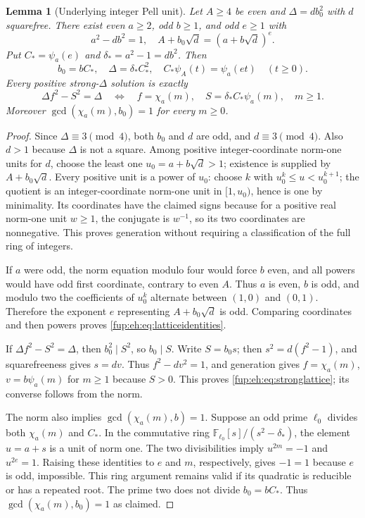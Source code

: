 \documentclass[11pt,letterpaper]{article}
\newtheorem{lemma}[theorem]{Lemma}
\theoremstyle{definition}\newtheorem{definition}[theorem]{Definition}
\theoremstyle{remark}\newtheorem{remark}[theorem]{Remark}
\newcommand{\D}{\Delta}
\begin{document}
\begin{lemma}[Underlying integer Pell unit]\label{fup:eh:lem:lattice}
Let $A\ge4$ be even and $\D=d b_0^2$ with $d$ squarefree.
There exist even $a\ge2$, odd $b\ge1$, and odd $e\ge1$ with
\[
 a^2-db^2=1,\quad
 A+b_0\sqrt d=(a+b\sqrt d)^e.
\]
Put $C_*=\psi_a(e)$ and $\delta_*=a^2-1=db^2$. Then
\begin{equation}\label{fup:eh:eq:latticeidentities}
 b_0=bC_*,\quad \D=\delta_*C_*^2,\quad
 C_*\psi_A(t)=\psi_a(et)\quad(t\ge0).
\end{equation}
Every positive strong-$\D$ solution is exactly
\begin{equation}\label{fup:eh:eq:stronglattice}
 \D f^2-S^2=\D
 \quad\Longleftrightarrow\quad
 f=\chi_a(m),\quad S=\delta_*C_*\psi_a(m),\quad m\ge1.
\end{equation}
Moreover $\gcd(\chi_a(m),b_0)=1$ for every $m\ge0$.
\end{lemma}
\begin{proof}
Since $\D\equiv3\pmod4$, both $b_0$ and $d$ are odd, and
$d\equiv3\pmod4$. Also $d>1$ because $\D$ is not a square.
Among positive integer-coordinate norm-one units for $d$, choose
the least one $u_0=a+b\sqrt d>1$; existence is supplied by
$A+b_0\sqrt d$. Every positive unit is a power of $u_0$:
choose $k$ with $u_0^k\le u<u_0^{k+1}$; the quotient is an
integer-coordinate norm-one unit in $[1,u_0)$, hence is one by
minimality. Its coordinates have the claimed signs because for a
positive real norm-one unit $w\ge1$, the conjugate is $w^{-1}$,
so its two coordinates are nonnegative. This proves generation
without requiring a classification of the full ring of integers.

If $a$ were odd, the norm equation modulo four would force $b$ even,
and all powers would have odd first coordinate, contrary to even $A$.
Thus $a$ is even, $b$ is odd, and modulo two the coefficients of
$u_0^k$ alternate between $(1,0)$ and $(0,1)$. Therefore the exponent
$e$ representing $A+b_0\sqrt d$ is odd. Comparing coordinates and
then powers proves \eqref{fup:eh:eq:latticeidentities}.

If $\D f^2-S^2=\D$, then $b_0^2\mid S^2$, so $b_0\mid S$.
Write $S=b_0s$; then $s^2=d(f^2-1)$, and squarefreeness gives
$s=dv$. Thus $f^2-dv^2=1$, and generation gives
$f=\chi_a(m)$, $v=b\psi_a(m)$ for $m\ge1$ because $S>0$.
This proves \eqref{fup:eh:eq:stronglattice}; its converse follows from the norm.

The norm also implies $\gcd(\chi_a(m),b)=1$. Suppose an odd prime
$\ell_0$ divides both $\chi_a(m)$ and $C_*$.
In the commutative ring
$\mathbb F_{\ell_0}[s]/(s^2-\delta_*)$, the element $u=a+s$
is a unit of norm one. The two divisibilities imply
$u^{2m}=-1$ and $u^{2e}=1$. Raising these identities to $e$ and
$m$, respectively, gives $-1=1$ because $e$ is odd, impossible.
This ring argument remains valid if its quadratic is reducible or has
a repeated root. The prime two does not divide $b_0=bC_*$.
Thus $\gcd(\chi_a(m),b_0)=1$ as claimed.
\end{proof}
\end{document}
